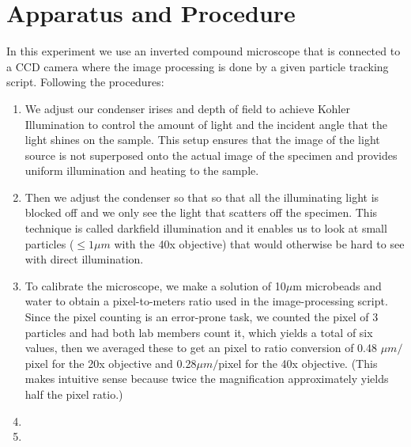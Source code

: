 \documentclass[iop,revtex4]{emulateapj_mod}
\begin{document}
\section{Apparatus and Procedure}\label{sec:ap}
In this experiment we use an inverted compound microscope that is connected to a CCD camera where the image processing is done by a given particle tracking script. Following the procedures:
\begin{enumerate}
\item  We adjust our condenser irises and depth of field to achieve Kohler Illumination to control the amount of light and the incident angle that the light shines on the sample. This setup ensures that the image of the light source is not superposed onto the actual image of the specimen and provides uniform illumination and heating to the sample.  
\item  Then we adjust the condenser so that so that all the illuminating light is blocked off and we only see the light that scatters off the specimen. This technique is called darkfield  illumination and it enables us to look at small particles ($\leq1\mu m$ with the 40x objective) that would otherwise be hard to see with direct illumination.
\item To calibrate the microscope, we make a solution of 10$\mu$m microbeads and water to obtain a pixel-to-meters ratio used in the image-processing script. Since the pixel counting is an error-prone task, we counted the pixel of 3 particles and had both lab members count it, which yields a total of six values, then we averaged these to get an pixel to ratio conversion of 0.48 $\mu m/$pixel for the 20x objective and 0.28$\mu m/$pixel for the 40x objective. (This makes intuitive sense because twice the magnification approximately yields half the pixel ratio.)
\item
\item 
\end{enumerate}
\end{document}
